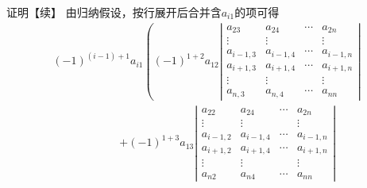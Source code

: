 \begin{frame}
  \begin{block}{证明【续】}
    由归纳假设，按行展开后合并含$a_{i1}$的项可得
    $$
    \begin{array}{l}
      (-1)^{(i-1)+1}a_{i1} \left ( (-1)^{1+2} a_{12}  \left|
      \begin{array}{cccc}
        a_{23}  & a_{24}  & \cdots & a_{2n}\\
        \vdots & \vdots & & \vdots \\
        a_{i-1,3}  & a_{i-1,4}  & \cdots & a_{i-1,n}\\
        a_{i+1,3}  & a_{i+1,4}  & \cdots & a_{i+1,n}\\
        \vdots & \vdots & & \vdots \\
        a_{n,3}  & a_{n,4}  & \cdots & a_{nn}
      \end{array}
      \right| \right. \\[0.4in]
      \qquad\qquad\qquad\left. + (-1)^{1+3} a_{13}   \left|
      \begin{array}{cccc}
        a_{22} & a_{24}  & \cdots & a_{2n}\\
        \vdots & \vdots & & \vdots \\
        a_{i-1,2} & a_{i-1,4}  & \cdots & a_{i-1,n}\\
        a_{i+1,2} & a_{i+1,4}  & \cdots & a_{i+1,n}\\
        \vdots & \vdots & & \vdots \\
        a_{n2}  & a_{n4} & \cdots & a_{nn}
      \end{array}
      \right|
      \right.
    \end{array}
    $$
  \end{block}
\end{frame}



